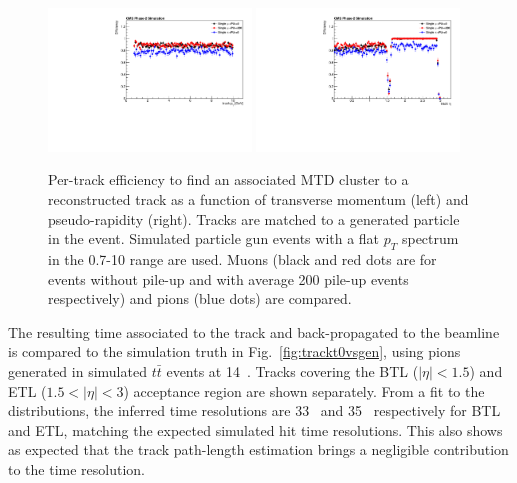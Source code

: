 \begin{figure}[!hbtp]
\centering
\includegraphics[width=0.48\textwidth]{fig/performance/ClusterAndTracks/divide_mtdTrack_pt_by_track_pt_mupiPUcomp.pdf}
\includegraphics[width=0.48\textwidth]{fig/performance/ClusterAndTracks/divide_mtdTrack_eta_by_track_eta_mupiPUcomp.pdf}
\caption{Per-track efficiency to find an associated MTD cluster to a reconstructed track as a function of transverse momentum (left) and pseudo-rapidity (right). Tracks are matched to a generated particle in the event. Simulated particle gun events with a flat $p_T$ spectrum in the 0.7-10 range are used. Muons (black and red dots are for events without pile-up and with average 200 pile-up events respectively) and pions (blue dots) are compared.}
\label{fig:trackclusterefficiency}
\end{figure}

The resulting time associated to the track and back-propagated to the beamline is compared to the simulation truth in Fig.~\ref{fig:trackt0vsgen}, using pions generated in simulated $t\bar{t}$ events at 14~. Tracks covering the BTL ($|\eta|<1.5$) and ETL ($1.5<|\eta|<3$) acceptance region are shown separately. From a fit to the distributions, the inferred time resolutions are 33~ and 35~ respectively for BTL and ETL, matching the expected simulated hit time resolutions. This also shows as expected that the track path-length estimation brings a negligible contribution to the time resolution.

